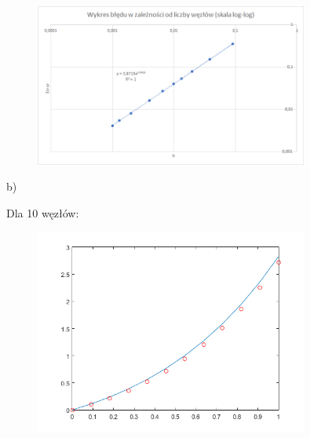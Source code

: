 \begin{samepage}
	
	\begin{figure}[!ht]
		\begin{center}
			\includegraphics[width=0.8\textwidth]{Lab4/charts/zad4/1/error.png}
		\end{center}
	\end{figure}
	\FloatBarrier
\end{samepage} 

\newpage

b)\\
\begin{samepage}
	Dla 10 węzłów:
	

	\FloatBarrier
	\begin{figure}[!ht]
		\begin{center}
			\includegraphics[width=0.8\textwidth]{Lab4/charts/zad4/2/10.png}
		\end{center}
	\end{figure}
	\FloatBarrier
\end{samepage}

